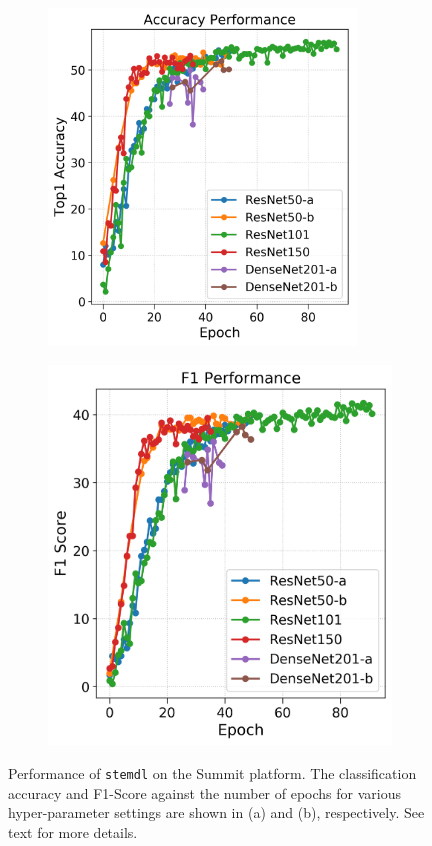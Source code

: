 \begin{figure}[!htb]
    \begin{subfigure}{0.49\textwidth}
    \centering
    \includegraphics[width=0.9\textwidth]{images/stemdl/image5a.png}
    \caption{}
    \label{fig:stemdl-accuracy}
    \end{subfigure}
    \hfill
    \begin{subfigure}{0.49\textwidth}
    \centering
    \includegraphics[width=0.9\columnwidth]{images/stemdl/image5b.png}
    \caption{}
    \label{fig:stemdl-f1}
    \end{subfigure}
    \caption{Performance of {\tt stemdl} on the Summit platform.  The classification accuracy and F1-Score against the number of epochs for various hyper-parameter settings are shown in (a) and (b), respectively. See text for more details.}
    \label{fig:stemdl5}
\end{figure}

